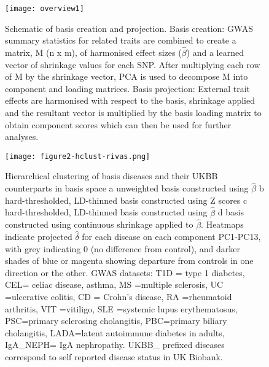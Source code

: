 \documentclass[11pt]{article}
\begin{document}
\setcounter{page}{26}
\begin{figure}
  \centering
  \texttt{[image: overview1]}
  \caption{Schematic of basis creation and projection. Basis creation: GWAS summary statistics for related traits are combined to create a matrix, M (n x m), of harmonised effect sizes ($\hat\beta$) and a learned vector of shrinkage values for each SNP. After multiplying each row of M by the shrinkage vector, PCA is used to decompose M into  component and loading matrices. Basis projection: External trait effects are harmonised with respect to the basis, shrinkage applied and the resultant vector is multiplied by the basis loading matrix to obtain component scores which can then be used for further analyses.}
  \label{fig:1}
\end{figure}


\begin{figure}
  \centering
  \texttt{[image: figure2-hclust-rivas.png]}
  \caption{Hierarchical clustering of basis diseases and their UKBB counterparts in basis space a unweighted basis constructed using $\hat\beta$  b hard-thresholded, LD-thinned basis constructed using Z scores c hard-thresholded, LD-thinned basis constructed using $\hat\beta$ d basis constructed using continuous shrinkage applied to $\hat\beta$.  Heatmaps indicate projected $\hat\delta$ for each disease on each component PC1-PC13, with grey indicating 0 (no difference from control), and darker shades of blue or magenta showing departure from controls in one direction or the other. GWAS datasets: T1D = type 1 diabetes, CEL= celiac disease, asthma, MS =multiple sclerosis, UC =ulcerative colitis, CD = Crohn's disease, RA =rheumatoid arthritis, VIT =vitiligo, SLE =systemic lupus erythematosus, PSC=primary sclerosing cholangitis, PBC=primary biliary cholangitis, LADA=latent autoimmune diabetes in adults, IgA\_NEPH= IgA nephropathy. UKBB\_ prefixed diseases correspond to self reported disease status in UK Biobank.}
  \label{fig:2}
\end{figure}
\end{document}
